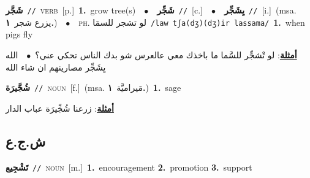 \documentclass[10pt,a4paper,twoside]{article} %
\begin{document}
\begin{multicols}{2}
{\setlength\topsep{0pt}\textbf{\foreignlanguage{arabic}{شَجَّر}}\ {\color{gray}\texttt{//}\color{black}}\ \textsc{verb}\ [p.]\ \textbf{1.}~grow tree(s)\ \ $\bullet$\ \ \setlength\topsep{0pt}\textbf{\foreignlanguage{arabic}{شَجِّر}}\ {\color{gray}\texttt{//}\color{black}}\ [c.]\ \ $\bullet$\ \ \setlength\topsep{0pt}\textbf{\foreignlanguage{arabic}{يِشَجِّر}}\ {\color{gray}\texttt{//}\color{black}}\ [i.]\ \color{gray}(msa. \foreignlanguage{arabic}{يزرع شجر}~\foreignlanguage{arabic}{\textbf{١.}})\color{black}\ \ $\bullet$\ \ \textsc{ph.} \color{gray} \foreignlanguage{arabic}{لو تشجر للسمَا}\color{black}\ {\color{gray}\texttt{/{\sffamily law tʃa(dʒ)(dʒ)ir lassama}/}\color{black}}\ \textbf{1.}~when pigs fly\  \begin{flushright}\color{gray}\foreignlanguage{arabic}{\textbf{\underline{\foreignlanguage{arabic}{أمثلة}}}: لو تْشجِّر للسَّما ما باخذك معي عالعرس شو بدك الناس تحكي عني؟\ $\bullet$\ \  الله يِشَجِّر مصارينهم ان شاء الله}\end{flushright}\color{black}} \vspace{2mm}

{\setlength\topsep{0pt}\textbf{\foreignlanguage{arabic}{شُجَّيرَة}}\ {\color{gray}\texttt{//}\color{black}}\ \textsc{noun}\ [f.]\ \color{gray}(msa. \foreignlanguage{arabic}{مَيراميَّة}~\foreignlanguage{arabic}{\textbf{١.}})\color{black}\ \textbf{1.}~sage\  \begin{flushright}\color{gray}\foreignlanguage{arabic}{\textbf{\underline{\foreignlanguage{arabic}{أمثلة}}}: زرعنا شُجِّيرَة عباب الدار}\end{flushright}\color{black}} \vspace{2mm}

\vspace{-3mm}
\subsection*{\color{blue}\foreignlanguage{arabic}{ش.ج.ع}\color{blue}{}} 

{\setlength\topsep{0pt}\textbf{\foreignlanguage{arabic}{تَشْجِيع}}\ {\color{gray}\texttt{//}\color{black}}\ \textsc{noun}\ [m.]\ \textbf{1.}~encouragement  \textbf{2.}~promotion  \textbf{3.}~support\ } \vspace{2mm}


\end{multicols}
\end{document}
